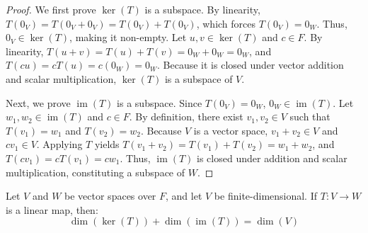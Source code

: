 \begin{proof}
We first prove $\ker(T)$ is a subspace. By linearity, $T(0_V) = T(0_V + 0_V) = T(0_V) + T(0_V)$, which forces $T(0_V) = 0_W$. Thus, $0_V \in \ker(T)$, making it non-empty. Let $u, v \in \ker(T)$ and $c \in F$. By linearity, $T(u + v) = T(u) + T(v) = 0_W + 0_W = 0_W$, and $T(cu) = cT(u) = c(0_W) = 0_W$. Because it is closed under vector addition and scalar multiplication, $\ker(T)$ is a subspace of $V$.

Next, we prove $\operatorname{im}(T)$ is a subspace. Since $T(0_V) = 0_W$, $0_W \in \operatorname{im}(T)$. Let $w_1, w_2 \in \operatorname{im}(T)$ and $c \in F$. By definition, there exist $v_1, v_2 \in V$ such that $T(v_1) = w_1$ and $T(v_2) = w_2$. Because $V$ is a vector space, $v_1 + v_2 \in V$ and $cv_1 \in V$. Applying $T$ yields $T(v_1 + v_2) = T(v_1) + T(v_2) = w_1 + w_2$, and $T(cv_1) = cT(v_1) = cw_1$. Thus, $\operatorname{im}(T)$ is closed under addition and scalar multiplication, constituting a subspace of $W$.
\end{proof}

\begin{theorem}
Let $V$ and $W$ be vector spaces over $F$, and let $V$ be finite-dimensional. If $T: V \to W$ is a linear map, then:
\[
\dim(\ker(T)) + \dim(\operatorname{im}(T)) = \dim(V)
\]
\end{theorem}

